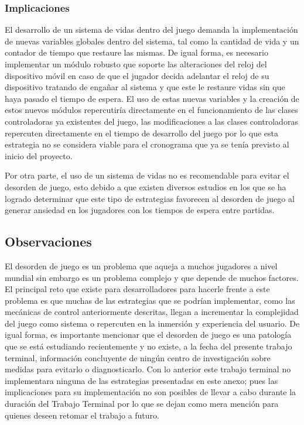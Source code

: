 \subsubsection{Implicaciones}
El desarrollo de un sistema de vidas dentro del juego demanda la implementación 
de nuevas variables globales dentro del sistema, tal como la cantidad de vida y 
un contador de tiempo que restaure las mismas. De igual forma, es necesario 
implementar un módulo robusto que soporte las alteraciones del reloj del 
dispositivo móvil en caso de que el jugador decida adelantar el reloj de su 
dispositivo tratando de engañar al sistema y que este le restaure vidas sin que 
haya pasado el tiempo de espera.  El uso de estas nuevas variables y la creación 
de estos nuevos módulos repercutiría directamente en el funcionamiento de las 
clases controladoras ya existentes del juego, las modificaciones a las clases 
controladoras repercuten directamente en el tiempo de desarrollo del juego por 
lo que esta estrategia no se considera viable para el cronograma que ya se tenía 
previsto al inicio del proyecto.
\\
\par
Por otra parte, el uso de un sistema de vidas no es recomendable para evitar el 
desorden de juego, esto debido a que existen diversos estudios en los que se ha 
logrado determinar que este tipo de estrategias favorecen al desorden de juego 
al generar ansiedad en los jugadores con los tiempos de espera entre partidas.

\subsection{Observaciones}
El desorden de juego es un problema que aqueja a muchos jugadores a nivel 
mundial sin embargo es un problema complejo y que depende de muchos factores. El 
principal reto que existe para desarrolladores para hacerle frente a este 
problema es que muchas de las estrategias que se podrían implementar, como las 
mecánicas de control anteriormente descritas, llegan a incrementar la 
complejidad del juego como sistema o repercuten en la inmersión y experiencia 
del usuario. De igual forma, es importante mencionar que el desorden de juego es 
una patología que se está estudiando recientemente y no existe, a la fecha del 
presente trabajo terminal, información concluyente de ningún centro de 
investigación sobre medidas para evitarlo o diagnosticarlo. Con lo anterior este 
trabajo terminal no implementara ninguna de las estrategias presentadas en este 
anexo; pues las implicaciones para su implementación no son posibles de llevar a 
cabo durante la duración del Trabajo Terminal por lo que se dejan como mera 
mención para quienes deseen retomar el trabajo a futuro.
